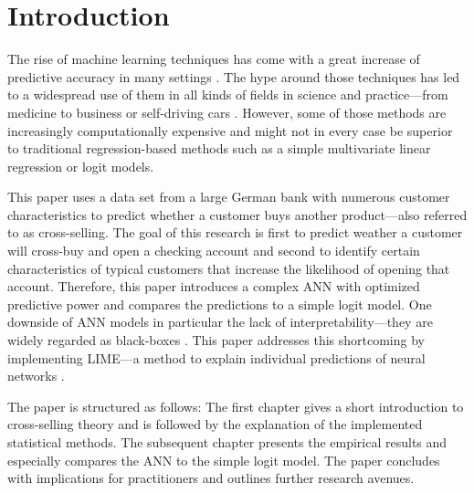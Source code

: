\documentclass[12pt,a4paper]{article}
\begin{document}
\pagebreak
\pagestyle{plain}
\tableofcontents
\pagebreak
\listoffigures
\listoftables
\newpage
\setcounter{page}{2}
\setlength{\baselineskip}{1.5\baselineskip}
\pagestyle{plain}


\section{Introduction}

The rise of machine learning techniques has come with a great increase
of predictive accuracy in many settings \citep{jordanMachineLearningTrends2015}. The hype around those techniques has led to a widespread use of them in all kinds of fields in science and practice---from medicine to business or self-driving cars \citep{chenMachineLearningPrediction2017}.
However, some of those methods are increasingly computationally expensive and might not in every case be superior to traditional regression-based methods such as a simple multivariate linear regression or logit models.

This paper uses a data set from a large German bank with numerous customer characteristics to predict whether a customer buys another
product---also referred to as cross-selling.
The goal of this research is first to predict weather a customer will cross-buy and open a checking account and second to identify certain characteristics of typical customers that increase the likelihood of opening that account.
Therefore, this paper introduces a complex ANN with optimized predictive power and compares the predictions to a simple logit model.
One downside of ANN models in particular the lack of interpretability---they are widely regarded as black-boxes \citep{benitezAreArtificialNeural1997, dayhoffArtificialNeuralNetworks2001}.
This paper addresses this shortcoming by implementing LIME---a method to explain individual predictions of neural networks \citep{ribeiroWhyShouldTrust2016a}.

The paper is structured as follows: The first chapter gives a short introduction to cross-selling theory and is followed by the explanation of the implemented statistical methods.
The subsequent chapter presents the empirical results and especially compares the ANN to the simple logit model.
The paper concludes with implications for practitioners and outlines further research avenues.
\end{document}

